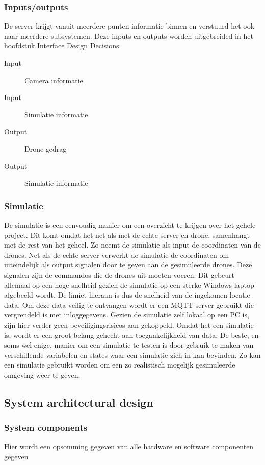 \subsubsection*{Inputs/outputs}
De server krijgt vanuit meerdere punten informatie binnen en verstuurd het ook naar meerdere subsystemen.
Deze inputs en outputs worden uitgebreided in het hoofdstuk Interface Design Decisions.


\begin{description}
    \item[Input] Camera informatie
    \item[Input] Simulatie informatie
    \item[Output] Drone gedrag
    \item[Output] Simulatie informatie
\end{description}

\subsubsection{Simulatie}
De simulatie is een eenvoudig manier om een overzicht te krijgen over het gehele project. Dit komt omdat het net als met de echte server en drone, samenhangt met de rest van het geheel. Zo neemt de simulatie als input de coordinaten van de drones. Net als de echte server verwerkt de simulatie de coordinaten om uiteindelijk als output signalen door te geven aan de gesimuleerde drones. Deze signalen zijn de commandos die de drones uit moeten voeren. Dit gebeurt allemaal op een hoge snelheid gezien de simulatie op een sterke Windows laptop afgebeeld wordt. De limiet hieraan is dus de snelheid van de ingekomen locatie data. Om deze data veilig te ontvangen wordt er een MQTT server gebruikt die vergrendeld is met inloggegevens. Gezien de simulatie zelf lokaal op een PC is, zijn hier verder geen beveiligingsrisicos aan gekoppeld. Omdat het een simulatie is, wordt er een groot belang gehecht aan toegankelijkheid van data. De beste, en soms wel enige, manier om een simulatie te testen is door gebruik te maken van verschillende variabelen en states waar een simulatie zich in kan bevinden. Zo kan een simulatie gebruikt worden om een zo realistisch mogelijk gesimuleerde omgeving weer te geven.


\subsection{System architectural design}

\subsubsection{System components}
Hier wordt een opsomming gegeven van alle hardware en software componenten gegeven

